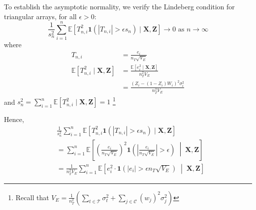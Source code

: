 \documentclass{mytemplate}
\begin{document}
To establish the asymptotic normality, we verify the Lindeberg condition for triangular arrays, for all $\epsilon > 0$:
\begin{equation}
\frac{1}{s_n^2} \sum_{i=1}^n \mathbb{E}\left[T_{n,i}^2 \mathbf{1}(|T_{n,i}| > \epsilon s_n) \mid \mathbf{X}, \mathbf{Z}\right] \rightarrow 0 \text{ as } n\rightarrow \infty
\end{equation}
where
\begin{align*}
T_{n,i} &= \frac{e_i}{n_T\sqrt{V_E}} \\
\mathbb{E}[T_{n,i}^2 \mid \mathbf{X}, \mathbf{Z}] &= \frac{\mathbb{E}[e_i^2 \mid \mathbf{X}, \mathbf{Z}]}{n_T^2 V_E} \\
&= \frac{(Z_i - (1-Z_i)W_i)^2 \sigma_i^2}{n_T^2 V_E}
\end{align*}
and $s_n^2 = \sum_{i=1}^n \mathbb{E}[T_{n,i}^2 \mid \mathbf{X}, \mathbf{Z}] = 1$ \footnote{Recall that $V_E = \frac{1}{n_T^2} \left(\sum_{t \in \mathcal{T}} \sigma_{t}^2 + \sum_{j \in \mathcal{C}} (w_j)^2 \sigma_{j}^2 \right)$}

Hence, 
\begin{align}
    &\frac{1}{s_n^2} \sum_{i=1}^n \mathbb{E}\left[T_{n,i}^2 \mathbf{1}(|T_{n,i}| > \epsilon s_n) \mid \mathbf{X}, \mathbf{Z}\right] \\
    &= \sum_{i=1}^n \mathbb{E}\left[\left(\frac{e_i}{n_T\sqrt{V_E}}\right)^2 \mathbf{1}\left(\left|\frac{e_i}{n_T\sqrt{V_E}}\right| > \epsilon\right) \;\middle|\; \mathbf{X}, \mathbf{Z}\right] \\
    &= \frac{1}{n_T^2 V_E} \sum_{i=1}^n \mathbb{E}\left[e_i^2 \cdot \mathbf{1}(|e_i| > \epsilon n_T \sqrt{V_E}) \;\middle|\; \mathbf{X}, \mathbf{Z}\right] \label{eq:last-lindeberg}
\end{align}
\end{document}
